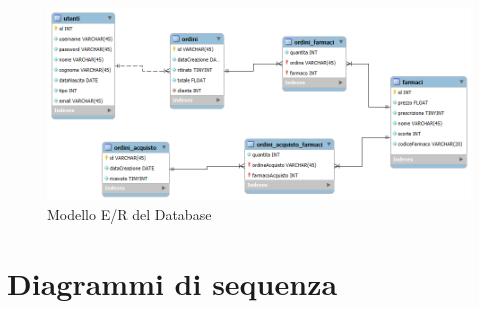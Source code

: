 \begin{figure}[h]
    \centering
	\includegraphics[width=\linewidth]{assets/Modello_ER_DB.png}
    \caption{Modello E/R del Database}
\end{figure}

\section{Diagrammi di sequenza}